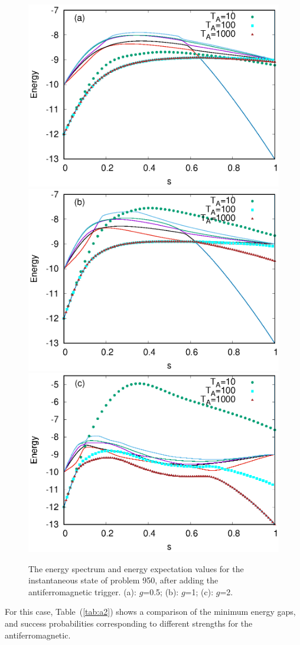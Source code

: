 \documentclass[../main.tex]{subfiles}
\begin{document}
\begin{figure}
\centering 
\includegraphics[scale=0.8 ]{950_s12_A_g0.eps}
\includegraphics[scale=0.8 ]{950_s12_A_g1.eps}
\includegraphics[scale=0.8 ]{950_s12_A_g2.eps}
\caption{The energy spectrum and energy expectation values for the instantaneous state of problem 950, after adding the antiferromagnetic trigger. (a): $g$=0.5; (b): $g$=1; (c): $g$=2. }
\label{fig:a4}
\end{figure}
For this case, Table~(\ref{tab:a2}) shows a comparison of the minimum energy gaps, and success probabilities corresponding to different strengths for the antiferromagnetic. 
\end{document}
